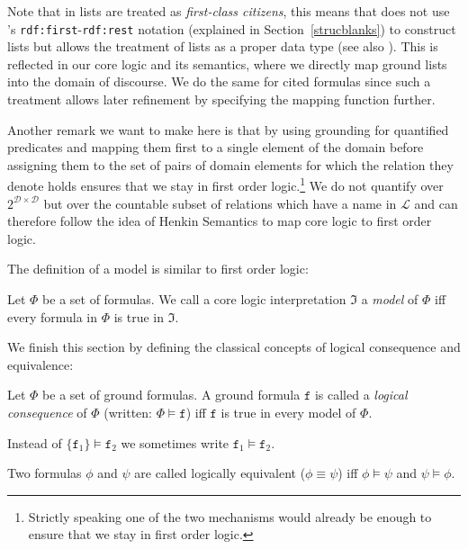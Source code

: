 Note that in \nthree lists are treated as \emph{first-class citizens}, this means that \nthree does not use \rdf's 
\texttt{rdf:first}-\texttt{rdf:rest} notation (explained in Section~\ref{strucblanks}) 
to construct lists but allows the treatment of lists as a proper data type (see also \cite[p.6]{N3Logic}).  
This is reflected
in our core logic and its semantics, where we directly map ground lists into the domain of discourse. We do the same for cited formulas since such a treatment allows later
refinement by specifying the mapping function further. %

Another remark we want to make here is that by using grounding for quantified predicates and mapping them first to a single element of the domain before assigning them
to the set of pairs of domain elements for which the relation they denote holds ensures  that we stay in first order 
logic.\footnote{Strictly speaking one of the two mechanisms would already be enough to ensure that we stay in first order logic.} 
We do not quantify over  $2^{\mathcal{D}\times\mathcal{D}}$ but over the countable subset of relations which have a name in $\mathcal{L}$ and can therefore follow the idea of  
Henkin Semantics \cite{henkin_1950} to map core logic to first order logic.
 

The definition of a model is similar to first order logic:


\begin{definition}[Model]
 Let $\Phi$ be a set of formulas. We call a core logic interpretation $\mathfrak{I}$ a \emph{model} of $\Phi$ iff every formula in $\Phi$ is true in $\mathfrak{I}$.
\end{definition}



We finish this section by defining the classical concepts of logical consequence and equivalence:

\begin{definition}
 Let $\Phi$ be a set of ground formulas. A ground formula $\texttt{f}$ is called a \emph{logical consequence} of $\Phi$ (written: $\Phi\models\texttt{f}$) 
 iff $\texttt{f}$ is true in every model 
 of $\Phi$.
\end{definition}
 Instead of $\{\texttt{f}_1\}\models \texttt{f}_2$ we sometimes write $\texttt{f}_1\models\texttt{f}_2$.

\begin{definition}
 Two formulas $\phi$ and $\psi$ are called logically equivalent ($\phi \equiv \psi$) iff $\phi \models \psi$ and $\psi\models \phi$.
\end{definition}

